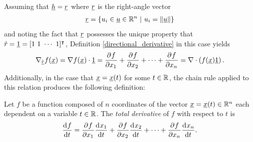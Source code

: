 Assuming that $\underline{h} = \underline{r}$ where $\underline{r}$ is the right-angle vector
\begin{align*}
  \underline{r} = \{u_i \in \underline{u} \in \mathbb{R}^n \ |\ u_i = \Vert \underline{u} \Vert \}
\end{align*}
and noting the fact that $\underline{r}$ possesses the unique property that $\hat{r} = \rankone{1} = [1\ 1\ \cdots\ 1]\T$, Definition \ref{directional_derivative} in this case yields
\begin{align*}
  \nabla_{\hat{\underline{r}}} f(\underline{x}) = \nabla f(\underline{x}) \cdot \underline{1} = \frac{\partial{^{}} f}{\partial x_1{^{}} } + \frac{\partial{^{}} f}{\partial x_2{^{}} } + \cdots + \frac{\partial{^{}} f}{\partial x_n{^{}} } = \nabla \cdot \left( f(\underline{x}) \underline{1} \right).
\end{align*}
Additionally, in the case that $\underline{x} = \underline{x}(t)$ for some $t \in \mathbb{R}$, the chain rule applied to this relation produces the following definition:
\begin{definition}
\label{total_derivative}
Let $f$ be a function composed of $n$ coordinates of the vector $\underline{x} = \underline{x}(t) \in \mathbb{R}^n$ each dependent on a variable $t \in \mathbb{R}$.
The \emph{total derivative} of $f$ with respect to $t$ is
\begin{align*}
  \frac{\mathrm{d}{^{}} f}{\mathrm{d} t{^{}} } = \frac{\partial{^{}} f}{\partial x_1{^{}} }\frac{\mathrm{d}{^{}} x_1}{\mathrm{d} t{^{}} } + \frac{\partial{^{}} f}{\partial x_2{^{}} }\frac{\mathrm{d}{^{}} x_2}{\mathrm{d} t{^{}} } + \cdots + \frac{\partial{^{}} f}{\partial x_n{^{}} }\frac{\mathrm{d}{^{}} x_n}{\mathrm{d} t{^{}} }.
\end{align*}
\end{definition}

